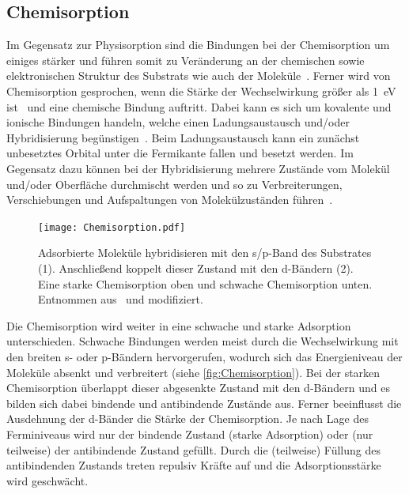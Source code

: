         \subsection{Chemisorption}
            Im Gegensatz zur Physisorption sind die Bindungen bei der Chemisorption um einiges stärker und führen somit zu Veränderung an der chemischen sowie elektronischen Struktur des Substrats wie auch der Moleküle~\cite{bergenti_spinterface_2019}.
            Ferner wird von Chemisorption gesprochen, wenn die Stärke der Wechselwirkung größer als \SI{1}{\electronvolt} ist~\cite{muscat_chemisorption_1978} und eine chemische Bindung auftritt.
            Dabei kann es sich um kovalente und ionische Bindungen handeln, welche einen Ladungsaustausch und/oder Hybridisierung begünstigen~\cite{harutyunyan_hybridisation_2013}.
            Beim Ladungsaustausch kann ein zunächst unbesetztes Orbital unter die Fermikante fallen und besetzt werden.
            Im Gegensatz dazu können bei der Hybridisierung mehrere Zustände vom Molekül und/oder Oberfläche durchmischt werden und so zu Verbreiterungen, Verschiebungen und Aufspaltungen von Molekülzuständen führen~\cite{IF_1}.

            \begin{figure}
                \centering
                \texttt{[image: Chemisorption.pdf]}
                \caption{Adsorbierte Moleküle hybridisieren mit den s/p-Band des Substrates (1).
                Anschließend koppelt dieser Zustand mit den d-Bändern (2).
                Eine starke Chemisorption oben und schwache Chemisorption unten.
                Entnommen aus~\cite{IF_1} und modifiziert.}
                \label{fig:Chemisorption}
            \end{figure}
            Die Chemisorption wird weiter in eine schwache und starke Adsorption unterschieden.
            Schwache Bindungen werden meist durch die Wechselwirkung mit den breiten s- oder p-Bändern hervorgerufen, wodurch sich das Energieniveau der Moleküle absenkt und verbreitert (siehe \autoref{fig:Chemisorption}).
            Bei der starken Chemisorption überlappt dieser abgesenkte Zustand mit den d-Bändern und es bilden sich dabei bindende und antibindende Zustände aus.
            Ferner beeinflusst die Ausdehnung der d-Bänder die Stärke der Chemisorption.
            Je nach Lage des Ferminiveaus wird nur der bindende Zustand (starke Adsorption) oder (nur teilweise) der antibindende Zustand gefüllt.
            Durch die (teilweise) Füllung des antibindenden Zustands treten repulsiv Kräfte auf und die Adsorptionsstärke wird geschwächt.

